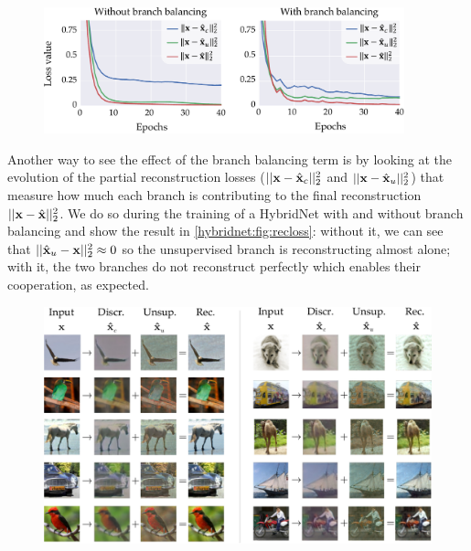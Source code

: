 \begin{figure}[t]
	\centering
	\includegraphics[width=0.93\textwidth]{images/hybridnet_recloss}
    \label{hybridnet:fig:recloss}
\end{figure}

Another way to see the effect of the branch balancing term is by looking at the evolution of the partial reconstruction losses ($||\mathbf{x} - \hat{\mathbf{x}}_c||_2^2$ and $||\mathbf{x} - \hat{\mathbf{x}}_u||_2^2$) that measure how much each branch is contributing to the final reconstruction $||\mathbf{x} - \hat{\mathbf{x}}||_2^2$. We do so during the training of a HybridNet with and without branch balancing and show the result in \autoref{hybridnet:fig:recloss}: without it, we can see that $||\hat{\mathbf{x}}_u - \mathbf{x}||_2^2 \approx 0$ so the unsupervised branch is reconstructing almost alone; with it, the two branches do not reconstruct perfectly which enables their cooperation, as expected.


\begin{figure}[t]
	\centering
	\includegraphics[width=\textwidth]{images/hybridnet_viz-stl}
    \label{hybridnet:fig:viz-stl}
\end{figure}

